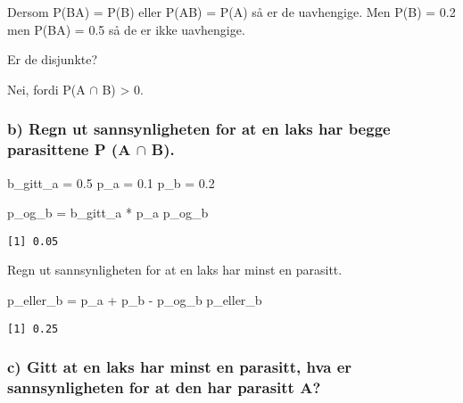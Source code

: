 \documentclass[
  12pt,
  a4paper,
  DIV=11,
  numbers=noendperiod]{scrartcl}
\newenvironment{Shaded}{\begin{snugshade}}{\end{snugshade}}
\newcommand{\FloatTok}[1]{\textcolor[rgb]{0.68,0.00,0.00}{#1}}
\newcommand{\NormalTok}[1]{\textcolor[rgb]{0.00,0.23,0.31}{#1}}
\newcommand{\OtherTok}[1]{\textcolor[rgb]{0.00,0.23,0.31}{#1}}
\newcommand{\SpecialCharTok}[1]{\textcolor[rgb]{0.37,0.37,0.37}{#1}}
\begin{document}
Dersom P(B\textbar A) = P(B) eller P(A\textbar B) = P(A) så er de
uavhengige. Men P(B) = 0.2 men P(B\textbar A) = 0.5 så de er ikke
uavhengige.

Er de disjunkte?

Nei, fordi P(A \(\cap\) B) \textgreater{} 0.

\subsubsection{\texorpdfstring{b) Regn ut sannsynligheten for at en laks
har begge parasittene P (A \(\cap\)
B).}{b) Regn ut sannsynligheten for at en laks har begge parasittene P (A \textbackslash cap B).}}\label{b-regn-ut-sannsynligheten-for-at-en-laks-har-begge-parasittene-p-a-cap-b.}

\begin{Shaded}
\begin{Highlighting}[]
\NormalTok{b\_gitt\_a }\OtherTok{=} \FloatTok{0.5}
\NormalTok{p\_a }\OtherTok{=} \FloatTok{0.1}
\NormalTok{p\_b }\OtherTok{=} \FloatTok{0.2}

\NormalTok{p\_og\_b }\OtherTok{=}\NormalTok{ b\_gitt\_a }\SpecialCharTok{*}\NormalTok{ p\_a}
\NormalTok{p\_og\_b}
\end{Highlighting}
\end{Shaded}

\begin{verbatim}
[1] 0.05
\end{verbatim}

Regn ut sannsynligheten for at en laks har minst en parasitt.

\begin{Shaded}
\begin{Highlighting}[]
\NormalTok{p\_eller\_b }\OtherTok{=}\NormalTok{ p\_a }\SpecialCharTok{+}\NormalTok{ p\_b }\SpecialCharTok{{-}}\NormalTok{ p\_og\_b}
\NormalTok{p\_eller\_b}
\end{Highlighting}
\end{Shaded}

\begin{verbatim}
[1] 0.25
\end{verbatim}

\subsubsection{c) Gitt at en laks har minst en parasitt, hva er
sannsynligheten for at den har parasitt
A?}\label{c-gitt-at-en-laks-har-minst-en-parasitt-hva-er-sannsynligheten-for-at-den-har-parasitt-a}
\end{document}
